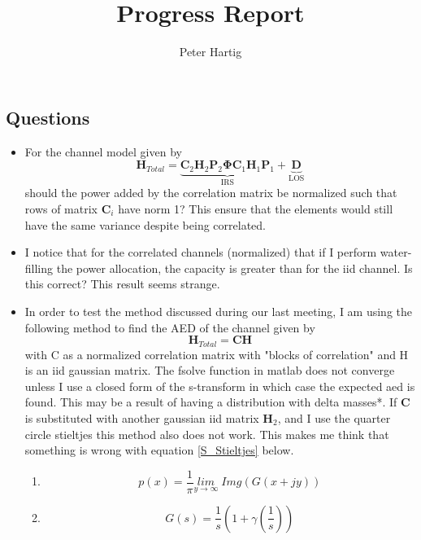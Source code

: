 \documentclass[12pt,a4paper]{report}
\title{Progress Report}
\author{Peter Hartig}
\begin{document}
\subsection{Questions}
\begin{itemize}
\item 
For the channel model given by 
	\begin{equation}
	\mathbf{H}_{Total} =  \underbrace{\mathbf{C}_{2}\mathbf{H}_{2}\mathbf{P}_{2}\boldsymbol{\Phi}\mathbf{C}_{1}\mathbf{H}_{1}\mathbf{P}_{1}}_{\text{IRS}} + \underbrace{\mathbf{D}}_{\text{LOS} }
	\end{equation}
should the power added by the correlation matrix be normalized such that rows of matrix $\mathbf{C}_{i}$ have norm 1?
This ensure that the elements would still have the same variance despite being correlated. 
\item 
I notice that for the correlated channels (normalized) that if I perform water-filling the power allocation, the capacity is greater than for 
the iid channel. Is this correct? This result seems strange. 

\item 
In order to test the method discussed during our last meeting, I am using the following method to find the AED of the channel given by 
	\begin{equation}
	\mathbf{H}_{Total} = \mathbf{C}\mathbf{H}
	\end{equation}
	with C as a normalized correlation matrix with "blocks of correlation" and H is an iid gaussian matrix. 
	The fsolve function in matlab does not converge unless I use a closed form of the s-transform in which case the expected aed is found. This may be a result of having a distribution with delta masses*. If $\mathbf{C}$ is substituted with another gaussian iid matrix $\mathbf{H}_2 $, and I use the quarter circle stieltjes this method also does not work. This makes me think that something is wrong with equation \eqref{S_Stieltjes} below.
\begin{enumerate}
\item 
	\begin{equation}
	p(x) = \frac{1}{\pi} \underset{y \rightarrow \infty}{lim} \; Img(G(x+jy))
	\end{equation}
	
\item 
	\begin{equation}
	G(s)=  \frac{1}{s} (1+\gamma\left(\frac{1}{s}\right))
	\end{equation}
		

\end{enumerate}
\end{itemize}
\end{document}
